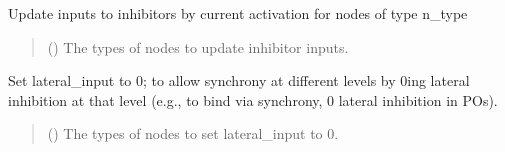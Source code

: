 \documentclass[letterpaper,10pt,english]{sphinxmanual}
\begin{document}
\begin{fulllineitems}
\begin{fulllineitems}
\label{\detokenize{nodes:nodes.nodeTensors.Tokens.update_inhibitor_input}}
\pysigstartsignatures
\pysiglinewithargsret
{}
{}
{}
\pysigstopsignatures
\sphinxAtStartPar
Update inputs to inhibitors by current activation for nodes of type n\_type
\begin{quote}\begin{description}
\sphinxAtStartPar
{} (\sphinxstyleliteralemphasis{\sphinxupquote{{[}}}{\hyperref[\detokenize{nodes:nodes.nodeEnums.Type}]{\sphinxcrossref{\sphinxstyleliteralemphasis{\sphinxupquote{Type}}}}}\sphinxstyleliteralemphasis{\sphinxupquote{{]}}}) \textendash{} The types of nodes to update inhibitor inputs.

\end{description}\end{quote}

\end{fulllineitems}


\begin{fulllineitems}
\label{\detokenize{nodes:nodes.nodeTensors.Tokens.zero_lateral_input}}
\pysigstartsignatures
\pysiglinewithargsret
{}
{}
{}
\pysigstopsignatures
\sphinxAtStartPar
Set lateral\_input to 0;
to allow synchrony at different levels by 0\sphinxhyphen{}ing lateral inhibition at that level
(e.g., to bind via synchrony, 0 lateral inhibition in POs).
\begin{quote}\begin{description}
\sphinxAtStartPar
{} (\sphinxstyleliteralemphasis{\sphinxupquote{{[}}}{\hyperref[\detokenize{nodes:nodes.nodeEnums.Type}]{\sphinxcrossref{\sphinxstyleliteralemphasis{\sphinxupquote{Type}}}}}\sphinxstyleliteralemphasis{\sphinxupquote{{]}}}) \textendash{} The types of nodes to set lateral\_input to 0.

\end{description}\end{quote}

\end{fulllineitems}


\end{fulllineitems}
\end{document}
